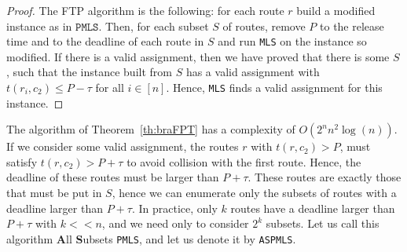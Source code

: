 \documentclass[a4paper,10pt]{journal}
\newcommand\MLS{\texttt{MLS}\xspace}
\newcommand\PMLS{\texttt{PMLS}\xspace}
\newcommand\ASPMLS{\texttt{ASPMLS}\xspace}
\begin{document}
\begin{proof}
The FTP algorithm is the following: for each route $r$ build a modified instance as in $\PMLS$.
Then, for each subset $S$ of routes, remove $P$ to the release time and to the deadline of each route in $S$ and run \MLS on the instance so modified. If there is a valid assignment, then we have proved that there is some $S$, such that the instance built from $S$ has a valid assignment with $t(r_i,c_2) \leq P - \tau$ for all $i\in [n]$. Hence, \MLS finds a valid assignment for this instance.
\end{proof}

The algorithm of Theorem~\ref{th:braFPT} has a complexity of $O(2^nn^2\log(n))$. If we consider some valid assignment, the routes $r$ with $t(r,c_2) > P$, must satisfy $t(r,c_2) > P + \tau$ to avoid collision with the first route. Hence, the deadline of these routes must be larger than $P + \tau$. These routes are exactly those that must be put in $S$, hence we can enumerate only the subsets of routes with a deadline larger than $P + \tau$. In practice, only $k$ routes have a deadline larger than $P + \tau$ with $k << n$, and we need only to consider $2^k$ subsets. Let us call this algorithm \textbf{A}ll \textbf{S}ubsets \PMLS, and let us denote it by \ASPMLS.
\end{document}
